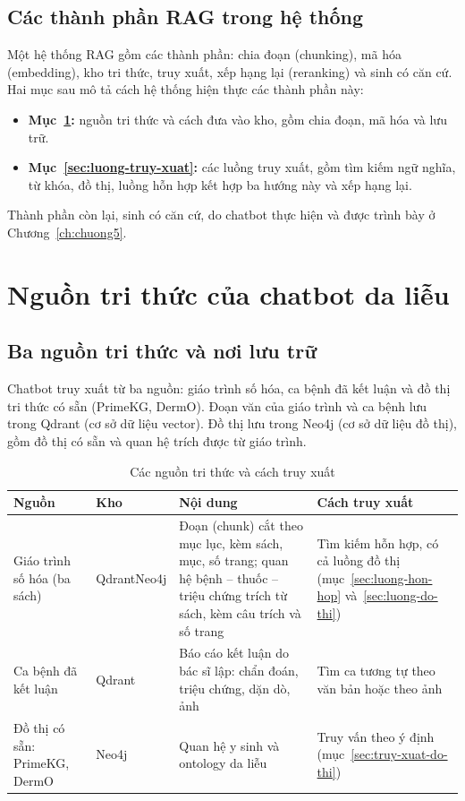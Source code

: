 \subsection{Các thành phần RAG trong hệ thống}

Một hệ thống RAG gồm các thành phần: chia đoạn (chunking), mã hóa (embedding), kho tri thức, truy xuất, xếp hạng lại (reranking) và sinh có căn cứ. Hai mục sau mô tả cách hệ thống hiện thực các thành phần này:
\begin{itemize}
  \item \textbf{Mục~\ref{sec:nguon-kb}:} nguồn tri thức và cách đưa vào kho, gồm chia đoạn, mã hóa và lưu trữ.
  \item \textbf{Mục~\ref{sec:luong-truy-xuat}:} các luồng truy xuất, gồm tìm kiếm ngữ nghĩa, từ khóa, đồ thị, luồng hỗn hợp kết hợp ba hướng này và xếp hạng lại.
\end{itemize}

Thành phần còn lại, sinh có căn cứ, do chatbot thực hiện và được trình bày ở Chương~\ref{ch:chuong5}.

\section{Nguồn tri thức của chatbot da liễu}
\label{sec:nguon-kb}

\subsection{Ba nguồn tri thức và nơi lưu trữ}

Chatbot truy xuất từ ba nguồn: giáo trình số hóa, ca bệnh đã kết luận và đồ thị tri thức có sẵn (PrimeKG, DermO). Đoạn văn của giáo trình và ca bệnh lưu trong Qdrant (cơ sở dữ liệu vector). Đồ thị lưu trong Neo4j (cơ sở dữ liệu đồ thị), gồm đồ thị có sẵn và quan hệ trích được từ giáo trình.


\begin{table}[H]
\centering
\caption{Các nguồn tri thức và cách truy xuất}
\label{tab:nguon-kb}
\small
\begin{tabular}{|p{3.2cm}|p{2.2cm}|p{5.6cm}|p{3.0cm}|}
\hline
\textbf{Nguồn} & \textbf{Kho} & \textbf{Nội dung} & \textbf{Cách truy xuất} \\ \hline
Giáo trình số hóa (ba sách) & Qdrant\newline Neo4j & Đoạn (chunk) cắt theo mục lục, kèm sách, mục, số trang; quan hệ bệnh -- thuốc -- triệu chứng trích từ sách, kèm câu trích và số trang & Tìm kiếm hỗn hợp, có cả luồng đồ thị (mục~\ref{sec:luong-hon-hop} và~\ref{sec:luong-do-thi}) \\ \hline
Ca bệnh đã kết luận & Qdrant & Báo cáo kết luận do bác sĩ lập: chẩn đoán, triệu chứng, dặn dò, ảnh & Tìm ca tương tự theo văn bản hoặc theo ảnh \\ \hline
Đồ thị có sẵn: PrimeKG, DermO & Neo4j & Quan hệ y sinh và ontology da liễu & Truy vấn theo ý định (mục~\ref{sec:truy-xuat-do-thi}) \\ \hline
\end{tabular}
\end{table}

